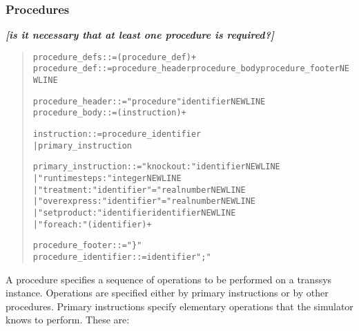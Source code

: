 \documentclass[a4paper,fleqn]{article}
\newcommand{\todo}[1]{\rule{0pt}{0pt}\marginpar{\rule{1ex}{1ex}}\textbf{\emph{[#1]}}}
\newenvironment{ebnfrule}{\begin{footnotesize}\begin{quote}\begin{alltt}}{\end{alltt}\end{quote}\end{footnotesize}}
\begin{document}
\subsubsection{Procedures}
\label{section_procedures}

\todo{is it necessary that at least one procedure is required?}

\begin{ebnfrule}
procedure_defs ::= (procedure_def)+
procedure_def ::= procedure_header procedure_body procedure_footer NEWLINE

procedure_header ::= "procedure" identifier NEWLINE 
procedure_body ::= (instruction)+

instruction ::= procedure_identifier
        | primary_instruction

primary_instruction ::= "knockout:" identifier NEWLINE
        | "runtimesteps:" integer NEWLINE
        | "treatment:" identifier "=" realnumber NEWLINE
        | "overexpress:" identifier "=" realnumber NEWLINE
        | "setproduct:" identifier identifier NEWLINE
        | "foreach:" (identifier)+

procedure_footer ::= "\}"
procedure_identifier ::= identifier ";"
\end{ebnfrule}
A procedure specifies a sequence of operations to be performed on a
transsys instance. Operations are specified either by primary
instructions or by other procedures. Primary instructions specify
elementary operations that the simulator knows to perform. These are:
\end{document}
